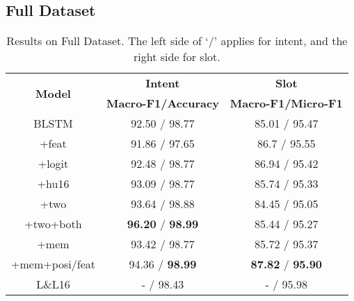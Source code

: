 

\subsection{Full Dataset}

\begin{table}
\setlength{\tabcolsep}{0.23em}
\centering
\small{
\begin{tabular}{|c|c|c|}

\hline
\multirow{2}{*}{\textbf{Model}} & \textbf{Intent} & \textbf{Slot} \\
\cline{2-3}
  & \textbf{Macro-F1/Accuracy} &  \textbf{Macro-F1/Micro-F1} \\
\hline
\rowcolor{Gray} BLSTM & 92.50 / 98.77  & 85.01 / 95.47\\
\hline
+feat & 91.86 / 97.65 & 86.7 / 95.55\\
\hline
\rowcolor{Gray} +logit & 92.48 / 98.77 & 86.94 / 95.42  \\
\hline
+hu16 & 93.09 / 98.77 & 85.74 / 95.33  \\
\hline
\rowcolor{Gray} +two & 93.64 / 98.88  & 84.45 / 95.05\\
\hline
+two+both & \textbf{96.20} / \textbf{98.99} & 85.44 / 95.27 \\
\hline
\rowcolor{Gray} +mem & 93.42 / 98.77 & 85.72 / 95.37\\
\hline
+mem+posi/feat & 94.36 / \textbf{98.99} & \textbf{87.82} / \textbf{95.90} \\
\hline
\hline
\rowcolor{Gray} L\&L16 & - / 98.43 & - / 95.98\\
\hline

\end{tabular}
}
\caption{Results on Full Dataset. The left side of `$/$' applies for intent, and the right side for slot.}
\label{tab_full}
\end{table}

